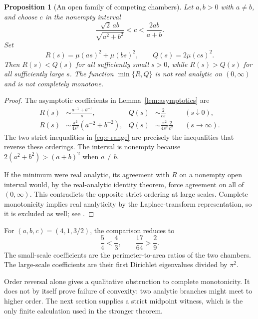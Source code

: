 \documentclass[11pt,a4paper]{article}
\newtheorem{proposition}[theorem]{Proposition}
\theoremstyle{definition}\newtheorem{definition}[theorem]{Definition}
\theoremstyle{remark}\newtheorem{remark}[theorem]{Remark}
\begin{document}
\begin{proposition}[An open family of competing chambers]
\label{prop:competing}
Let $a,b>0$ with $a\ne b$, and choose $c$ in the nonempty interval
\begin{equation}\label{eq:c-range}
 \frac{\sqrt2\,ab}{\sqrt{a^2+b^2}}
       <c<\frac{2ab}{a+b}.
\end{equation}
Set
\[
 R(s)=\mu(as)^2+\mu(bs)^2,\qquad Q(s)=2\mu(cs)^2.
\]
Then $R(s)<Q(s)$ for all sufficiently small $s>0$, while
$R(s)>Q(s)$ for all sufficiently large $s$. The function
$\min\{R,Q\}$ is not real analytic on $(0,\infty)$ and is
not completely monotone.
\end{proposition}
\begin{proof}
The asymptotic coefficients in Lemma~\ref{lem:asymptotics} are
\begin{align*}
 R(s)&\sim\frac{a^{-1}+b^{-1}}s,&Q(s)&\sim\frac{2}{cs}
 &&(s\downarrow0),\\
 R(s)&\sim\frac{\pi^2}{4s^2}(a^{-2}+b^{-2}),&
 Q(s)&\sim\frac{\pi^2}{4s^2}\frac2{c^2}
 &&(s\to\infty).
\end{align*}
The two strict inequalities in \eqref{eq:c-range} are precisely
the inequalities that reverse these orderings. The interval is
nonempty because
$2(a^2+b^2)>(a+b)^2$ when $a\ne b$.

If the minimum were real analytic, its agreement with $R$ on
a nonempty open interval would, by the real-analytic identity
theorem, force agreement on all of $(0,\infty)$. This contradicts
the opposite strict ordering at large scales. Complete
monotonicity implies real analyticity by the Laplace-transform
representation, so it is excluded as well; see \cite{SSV2012}.
\end{proof}

For $(a,b,c)=(4,1,3/2)$, the comparison reduces to
\begin{equation}\label{eq:ordering}
 \frac54<\frac43,
 \qquad \frac{17}{64}>\frac29.
\end{equation}
The small-scale coefficients are the perimeter-to-area ratios
of the two chambers. The large-scale coefficients are their
first Dirichlet eigenvalues divided by $\pi^2$.

Order reversal alone gives a qualitative obstruction to complete
monotonicity. It does not by itself prove failure of convexity:
two analytic branches might meet to higher order. The next
section supplies a strict midpoint witness, which is the only
finite calculation used in the stronger theorem.
\end{document}
